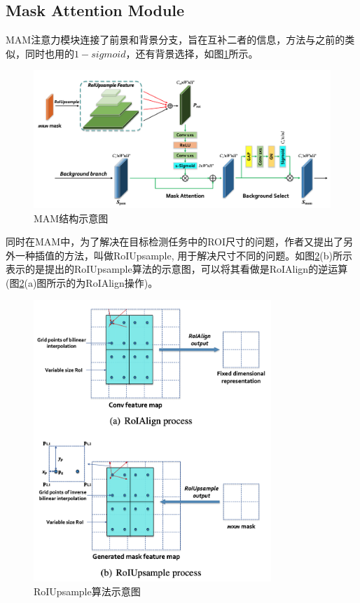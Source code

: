 \documentclass[cn]{elegantbook}
\begin{document}
\subsection{Mask Attention Module}
MAM注意力模块连接了前景和背景分支，旨在互补二者的信息，方法与之前的类似，同时也用的$1-sigmoid$，还有背景选择，如图\ref{mam}所示。

\begin{figure}[h]
	\centering
	\includegraphics[width=\textwidth]{images/mam}
	\caption{\label{mam}MAM结构示意图}
\end{figure}

同时在MAM中，为了解决在目标检测任务中的ROI尺寸的问题，作者又提出了另外一种插值的方法，叫做RoIUpsample, 用于解决尺寸不同的问题。如图\ref{roiupsample}(b)所示表示的是提出的RoIUpsample算法的示意图，可以将其看做是RoIAlign的逆运算(图\ref{roiupsample}(a)图所示的为RoIAlign操作)。

\begin{figure}[!ht]
	\centering
	\includegraphics[width=0.8\textwidth]{images/roiupsample}
	\caption{\label{roiupsample}RoIUpsample算法示意图}
\end{figure}
\end{document}
